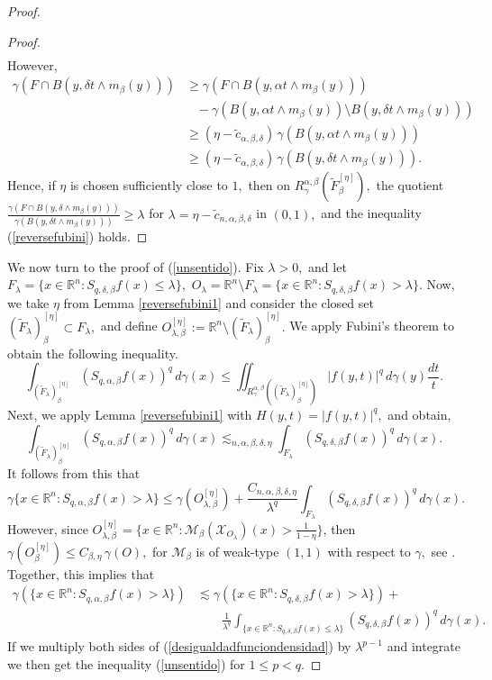 \documentclass[leqno,11pt]{amsart}
\theoremstyle{plain}
\theoremstyle{remark}
\begin{document}
{\begin{proof}
\begin{proof}
\begin{align*}
\end{align*}
However, \begin{align*}
\gamma (F\cap B(y, \delta t\wedge m_\beta (y)))&\ge \gamma(F\cap B(y, \alpha t\wedge m_\beta (y))) \\
& \;\;\; - \gamma(B(y, \alpha t\wedge m_\beta (y))\setminus B(y,\delta t\wedge m_\beta (y)))\\ & \ge (\eta- \widetilde{c}_{\alpha, \beta, \delta })\, \gamma(B(y,\alpha t\wedge m_\beta(y)))\\ &\ge (\eta- \widetilde{c}_{\alpha, \beta, \delta })\, \gamma(B(y,\delta t\wedge m_\beta(y))).
\end{align*}
Hence, if $\eta$ is chosen sufficiently close to $1,$ then on $R_\gamma^{\alpha,\beta}\left(\widetilde{F}_\beta^{[\eta]}\right),$ the quotient $\frac{\gamma(F\cap B(y, \delta\wedge m_\beta (y)))}{\gamma(B(y,\delta t\wedge m_\beta (y)))}\ge \lambda$ for $\lambda=\eta-\widetilde{c}_{n,\alpha,\beta, \delta}$ in $(0,1),$ and the inequality (\ref{reversefubini}) holds.
\end{proof}
We now turn to the proof of (\ref{unsentido}). Fix $\lambda >0,$ and let $F_\lambda=\{x\in \mathbb{R}^n: S_{q, \delta, \beta}f(x)\le \lambda\},$ $O_\lambda=\mathbb{R}^n\setminus F_\lambda= \{x\in \mathbb{R}^n: S_{q, \delta, \beta}f(x)> \lambda\}.$ Now, we take $\eta$ from Lemma \ref{reversefubini1} and consider the closed set $(\widetilde{F}_\lambda)_\beta^{[\eta]}\subset F_\lambda,$ and define $O_{\lambda, \beta}^{[\eta]}:=\mathbb{R}^n\setminus (\widetilde{F}_\lambda)_\beta^{[\eta]}.$ We apply Fubini's theorem to obtain the following inequality.
$$\int_{(\widetilde{F}_\lambda)_\beta^{[\eta]}}(S_{q,\alpha, \beta}f(x))^q\, d\gamma(x)\le \iint_{R^{\alpha, \beta}_\gamma((\widetilde{F}_\lambda)_\beta^{[\eta]})}|f(y,t)|^q\, d\gamma(y)\frac{dt}{t}.$$
Next, we apply Lemma \ref{reversefubini1} with $H(y,t)=|f(y,t)|^q,$ and obtain,
$$\int_{(\widetilde{F}_\lambda)_\beta^{[\eta]}}(S_{q,\alpha, \beta}f(x))^q\, d\gamma(x)\lesssim_{n,\alpha,\beta,\delta,\eta}\int_{F_\lambda} (S_{q,\delta, \beta}f(x))^q\, d\gamma(x).$$
It follows from this that
$$\gamma\{x\in \mathbb{R}^n: S_{q,\alpha, \beta}f(x)>\lambda\}\le \gamma(O_{\lambda, \beta}^{[\eta]})+\frac{C_{n,\alpha,\beta,\delta, \eta}}{\lambda^q}\int_{F_\lambda} (S_{q,\delta, \beta}f(x))^q\, d\gamma(x).$$
However, since $O_{\lambda, \beta}^{[\eta]}=\{x\in \mathbb{R}^n : \mathcal{M}_\beta (\mathcal{X}_{O_\lambda})(x)>\frac{1}{1-\eta}\}$, then  $\gamma(O_\beta^{[\eta]})\le C_{\beta, \eta}\, \gamma(O),$ for $\mathcal{M}_\beta$ is of weak-type $(1,1)$ with respect to $\gamma,$ see \cite{ur}. Together, this implies that
\begin{align}\label{desigualdadfunciondensidad}
\gamma(\{x\in \mathbb{R}^n: S_{q,\alpha, \beta}f(x)>\lambda\})&\lesssim \gamma(\{x\in \mathbb{R}^n: S_{q,\delta, \beta}f(x)>\lambda\})+ \nonumber\\&\qquad \frac{1}{\lambda^q}\int_{\{x\in \mathbb{R}^n: S_{q,\delta, \beta}f(x)\le \lambda\}}(S_{q,\delta,\beta}f(x))^q\, d\gamma(x).
\end{align}
If we multiply both sides of (\ref{desigualdadfunciondensidad}) by $\lambda^{p-1}$ and integrate we then get the inequality (\ref{unsentido}) for $1\le p<q.$


\end{proof}}
\end{document}
